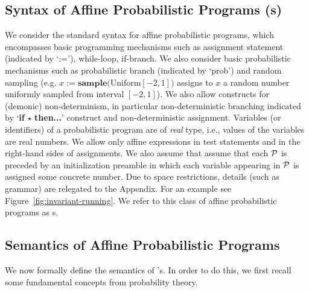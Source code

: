 \vspace{-1em}
\subsection{Syntax of Affine Probabilistic Programs (\APP s)}\label{subsec:syntax}
\vspace{-0.5em}

We consider the standard syntax for affine probabilistic programs,
which encompasses basic programming mechanisms such as assignment statement 
(indicated by `:='), while-loop, if-branch. We also consider basic probabilistic mechanisms 
such as probabilistic branch (indicated by `prob') and random sampling (e.g. 
$x:=\textbf{sample(}\mathrm{Uniform}[-2,1]\textbf{)}$ assigns to $x$ a random 
number 
uniformly sampled from interval $[-2,1]$). We also allow constructs for 
(demonic) non-determinism, in particular 
non-deterministic branching indicated by `\textbf{if }$\star$ \textbf{then...}' construct and non-deterministic assignment.  
Variables (or identifiers) of a probabilistic program are of \emph{real} type, i.e., 
values of the variables are real numbers. 
We allow only affine expressions in test statements and in the right-hand sides of assignments.
We also assume that assume that each \APP{} $\mathcal{P}$ is preceded by an initialization preamble 
in 
which 
each variable appearing in $\mathcal{P}$ is assigned some concrete number.
Due to space restrictions, details (such as grammar) are relegated to the Appendix.
For an example see Figure~\ref{fig:invariant-running}.
We refer to this class of affine probabilistic programs as \APP s.



\vspace{-1em}
\subsection{Semantics of Affine Probabilistic Programs}\label{subsec:semantics}
\vspace{-0.5em}

We now formally define the semantics of \APP's.
In order to do this, we first recall some fundamental concepts from probability
theory.

